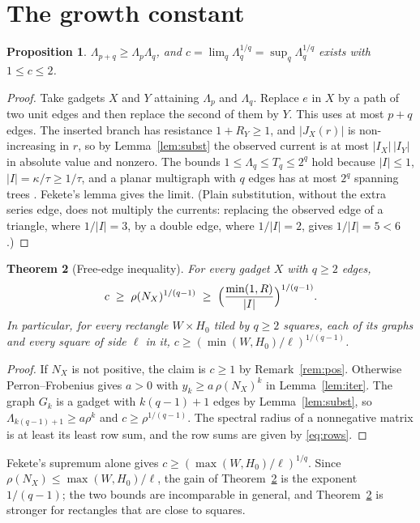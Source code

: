 \documentclass[11pt]{amsart}
\theoremstyle{plain}
\newtheorem{theorem}{Theorem}
\newtheorem{proposition}[theorem]{Proposition}
\theoremstyle{definition}
\theoremstyle{remark}
\newcommand{\Lam}{\Lambda}
\begin{document}
\section{The growth constant}

\begin{proposition}\label{prop:limit}
$\Lam_{p+q}\ge\Lam_p\Lam_q$, and $c=\lim_q\Lam_q^{1/q}=\sup_q\Lam_q^{1/q}$ exists with $1\le c\le2$.
\end{proposition}
\begin{proof}
Take gadgets $X$ and $Y$ attaining $\Lam_p$ and $\Lam_q$. Replace $e$ in $X$ by a path of two unit edges and then
replace the second of them by $Y$. This uses at most $p+q$ edges. The inserted branch has resistance $1+R_Y\ge1$, and
$|J_X(r)|$ is non-increasing in $r$, so by Lemma~\ref{lem:subst} the observed current is at most
$|I_X|\,|I_Y|$ in absolute value and nonzero. The bounds $1\le\Lam_q\le T_q\le2^q$ hold because
$|I|\le1$, $|I|=\kappa/\tau\ge1/\tau$, and a planar multigraph with $q$ edges has at most $2^q$ spanning trees \cite{Kenyon}.
Fekete's lemma \cite{Fekete} gives the limit. (Plain substitution, without the extra series edge, does not
multiply the currents: replacing the observed edge of a triangle, where $1/|I|=3$, by a double edge, where
$1/|I|=2$, gives $1/|I|=5<6$.)
\end{proof}

\begin{theorem}[Free-edge inequality]\label{thm:B}
For every gadget $X$ with $q\ge2$ edges,
\[
c\;\ge\;\rho(N_X)^{1/(q-1)}\;\ge\;\Bigl(\frac{\min(1,R)}{|I|}\Bigr)^{1/(q-1)} .
\]
In particular, for every rectangle $W\times H_0$ tiled by $q\ge2$ squares, each of its graphs and every square of
side $\ell$ in it, $c\ge(\min(W,H_0)/\ell)^{1/(q-1)}$.
\end{theorem}
\begin{proof}
If $N_X$ is not positive, the claim is $c\ge1$ by Remark~\ref{rem:pos}. Otherwise Perron--Frobenius gives $a>0$
with $y_k\ge a\,\rho(N_X)^k$ in Lemma~\ref{lem:iter}. The graph $G_k$ is a gadget with $k(q-1)+1$ edges by
Lemma~\ref{lem:subst}, so $\Lam_{k(q-1)+1}\ge a\rho^k$ and $c\ge\rho^{1/(q-1)}$. The spectral radius of a
nonnegative matrix is at least its least row sum, and the row sums are given by \eqref{eq:rows}.
\end{proof}

Fekete's supremum alone gives $c\ge(\max(W,H_0)/\ell)^{1/q}$. Since $\rho(N_X)\le\max(W,H_0)/\ell$, the gain of
Theorem~\ref{thm:B} is the exponent $1/(q-1)$; the two bounds are incomparable in general, and
Theorem~\ref{thm:B} is stronger for rectangles that are close to squares.
\end{document}
